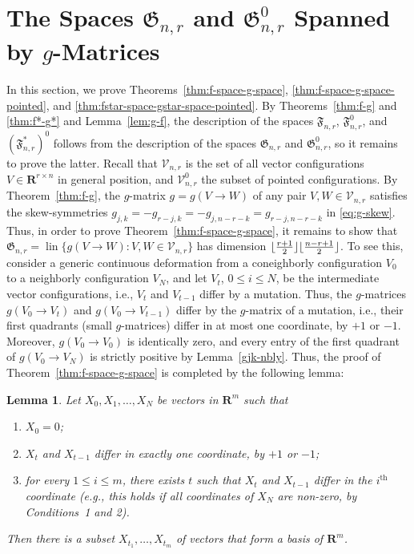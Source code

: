 \documentclass[11pt]{article}
\newtheorem{lemma}[theorem]{Lemma}
\DeclareMathOperator{\lin}{lin}
\newcommand{\fspace}{\mathfrak{F}}
\newcommand{\gspace}{\mathfrak{G}}
\renewcommand{\leq}{\leqslant}
\newcommand{\R}{\mathbf{R}}
\DeclarePairedDelimiter\floor{\lfloor}{\rfloor}
\begin{document}
\section{The Spaces $\gspace_{n,r}$ and $\gspace_{n,r}^0$ Spanned by $g$-Matrices}
\label{sec:g-space}
%
In this section, we prove Theorems~\ref{thm:f-space-g-space}, \ref{thm:f-space-g-space-pointed}, and \ref{thm:fstar-space-gstar-space-pointed}. By Theorems~\ref{thm:f-g} and \ref{thm:f*-g*} and Lemma~\ref{lem:g-f}, the description of the spaces $\fspace_{n,r}$, $\fspace^0_{n,r}$, and $(\fspace^*_{n,r})^0$ follows from the description of the spaces $\gspace_{n,r}$ and $\gspace_{n,r}^0$, so it remains to prove the latter. 
%
Recall that $\mathcal{V}_{n,r}$ is the set of all vector configurations $V\in \R^{r\times n}$ in general position, and $\mathcal{V}_{n,r}^0$ the subset of pointed configurations.
%
By Theorem~\ref{thm:f-g}, the $g$-matrix $g=g(V\to W)$ of any pair $V,W\in \mathcal{V}_{n,r}$ satisfies the skew-symmetries $g_{j,k}=-g_{r-j,k}=-g_{j,n-r-k}=g_{r-j,n-r-k}$ in \eqref{eq:g-skew}. Thus, in order to prove Theorem~\ref{thm:f-space-g-space}, it remains to show that $\gspace_{n,r}=\lin\{g(V\to W)\colon V,W\in \mathcal{V}_{n,r}\}$ has dimension $\floor{\frac{r+1}{2}} \floor{\frac{n-r+1}{2}}$. To see this, consider a generic continuous deformation from a coneighborly configuration $V_0$ to a neighborly configuration $V_N$, and let $V_t$, $0\leq i \leq N$,  be the intermediate vector configurations, i.e., $V_t$ and $V_{t-1}$ differ by a mutation. Thus, the $g$-matrices $g(V_0\to V_t)$ and $g(V_0\to V_{t-1})$ differ by the $g$-matrix of a mutation, i.e., their first quadrants (small $g$-matrices) differ in at most one coordinate, by $+1$ or $-1$. Moreover, $g(V_0\to V_0)$ is identically zero, and every entry of the first quadrant of $g(V_0\to V_N)$ is strictly positive by Lemma~\ref{gjk-nbly}. Thus, the proof of Theorem~\ref{thm:f-space-g-space} is completed by the following lemma:
%
\begin{lemma} 
\label{lem:basis1}
Let $X_0,X_1,\dots,X_N$ be vectors in $\R^m$ such that
\label{lem:basis}
\begin{enumerate}
\item $X_0=0$;
\item $X_t$ and $X_{t-1}$ differ in exactly one coordinate, by $+1$ or $-1$;
\item for every $1 \leq i \leq m$, there exists $t$ such that $X_t$ and $X_{t-1}$ differ in the $i^{\text{th}}$ coordinate
(e.g., this holds if all coordinates of $X_N$ are non-zero, by Conditions~1 and 2).
\end{enumerate}
Then there is a subset $X_{t_1}, \dots, X_{t_m}$ of vectors that form a basis of $\R^m$.
\end{lemma}
\end{document}
